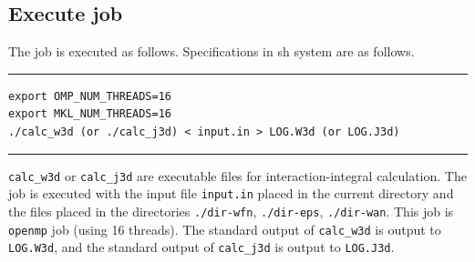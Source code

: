 \documentclass{article}
\begin{document}
\subsection{\label{job-calc-int}Execute job}
The job is executed as follows. Specifications in sh system are as follows.
\vspace{3mm}\hrule
\begin{verbatim}
export OMP_NUM_THREADS=16
export MKL_NUM_THREADS=16
./calc_w3d (or ./calc_j3d) < input.in > LOG.W3d (or LOG.J3d)  
\end{verbatim}
\hrule\vspace{3mm}
\verb+calc_w3d+ or \verb+calc_j3d+ are executable files for interaction-integral calculation. The job is executed with the input file \verb+input.in+ placed in the current directory and the files placed in the directories \verb+./dir-wfn+, \verb+./dir-eps+, \verb+./dir-wan+. This job is \verb+openmp+ job (using 16 threads). The standard output of \verb+calc_w3d+ is output to \verb+LOG.W3d+, and the standard output of \verb+calc_j3d+ is output to \verb+LOG.J3d+.
\end{document}
